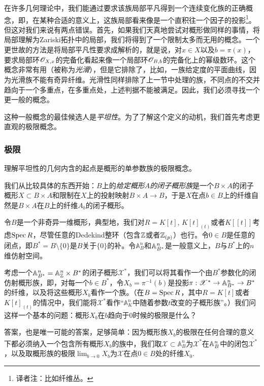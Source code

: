在许多几何理论中，我们能通过要求该族局部平凡得到一个连续变化族的正确概念，即，在某种合适的意义上，这族局部看来像是一个直积往一个因子的投影\footnote{译者注：比如纤维丛。}。但这对我们来说有两点错误。首先，如果我们天真地尝试对概形做同样的事情，将局部理解为Zariski拓扑中的局部，我们将得到了一个限制太多而无用的概念。一个更世故的方法是将局部平凡性要求成解析的，就是说，对$x\in X$以及$b=\pi(x)$，要求局部环$\mathscr{O}_{X,x}$的完备化看起来像一个局部环$\mathscr{O}_{B,b}$的完备化上的幂级数环。这个概念非常有用（被称为\textit{光滑}），但是它排除了，比如，一族给定度的平面曲线，因为光滑族不能有奇异纤维。光滑性同样排除了上一节中处理的族，不同点的不交并趋向于一个多重点，在多重点处，上述判据不能被满足。因此，我们必须寻找一个更一般的概念。

这种一般概念的最佳候选人是\textit{平坦性}。为了了解这个定义的动机，我们首先考虑更直观的极限概念。

\subsubsection*{极限}

理解平坦性的几何内含的起点是概形的单参数族的极限概念。

我们从比较具体的东西开始：$B$上的\textit{给定概形$A$的闭子概形族}是一个$B\times A$的闭子概形$X\subset B\times A$和限制在$X$上的投射映射$B\times A\to B$，于是$X$在点$b\in B$上的纤维自然是$B\times A$在$B$上的纤维$A_b$的闭子概形。

令$B$是一个非奇异一维概形，典型地，我们对$R=K[t]$, $K[t]_{(t)}$或者$K[\![t]\!]$考虑$\operatorname{Spec} R$，尽管任意的Dedekind整环（包含$\mathbb{Z}$或者$\mathbb{Z}_{(p)}$）也行。令$0\in B$是任意的闭点，即$B^*=B\setminus \{0\}$是$B$关于$\{0\}$的补。令$\mathbb{A}_B^n$和$\mathbb{A}_{B^*}^n$是一般意义上，$B$与$B^*$上的$n$维仿射空间。

考虑一个$\mathbb{A}_{B^*}^n=\mathbb{A}_{\mathbb{Z}}^n\times B^*$的闭子概形$\mathscr{X}^*$，我们可以将其看作一个由$B^*$参数化的闭仿射概形族，即，对每一个$b\in B^*$，令$X_b=\pi^{-1}(b)$是投影$\pi:\mathscr{X}^*\to \mathbb{A}_{B^*}^n\to B^*$的纤维，以及将这些概形$X_b$看作一个族。（在$B=\operatorname{Spec} R$，其中$R=K[t]$或者$K[t]_{(t)}$的情况中，我们能将$\mathscr{X}^*$看作“$\mathbb{A}_K^n$中随着参数$t$改变的子概形族”。）我们问这样一个基本的问题：概形$X_b$在$b$趋向于$0$时候的极限是什么？


答案，也是唯一可能的答案，足够简单：因为概形族$X_b$的极限在任何合理的意义下都必须纳入一个包含所有概形$X_b$的族中，我们取$\mathscr{X}\subset \mathbb{A}_B^n$为$\mathscr{X}^*$在$\mathbb{A}_B^n$中的闭包$\overline{\mathscr{X}^*}$，以及取概形族的极限$\lim_{b\to 0}X_b$为$\mathscr{X}$在点$0\in B$处的纤维$X_0$.


